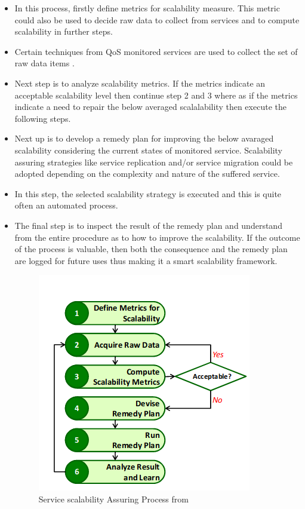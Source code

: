 \begin{itemize}
	

\item In this process, firstly define metrics for scalability measure. This metric could also be used to decide raw data to collect from services and to compute scalability in further steps.

\item Certain techniques from QoS monitored services are used to collect the set of raw data items \cite{Artaiam2008EnhancingSQ} \cite{hutchison_monitoring_2007}.

\item Next step is to analyze scalability metrics. If the metrics indicate an acceptable scalability level then continue step 2 and 3 where as if the metrics indicate a need to repair the below averaged scalalability then execute the following steps. 


\item Next up is to develop a remedy plan for improving the below avaraged scalability considering the current states of monitored service. Scalability assuring strategies like service replication and/or service migration could be adopted depending on the complexity and nature of the suffered service. 


\item In this step, the selected scalability strategy is executed and this is quite often an automated process. 

\item The final step is to inspect the result of the remedy plan and understand from the entire procedure as to how to improve the scalability. If the outcome of the process is valuable, then both the consequence and the remedy plan are logged for future uses thus making it a smart scalability framework.


\begin{figure}[h]
	\centering
	\includegraphics[width=0.7\linewidth]{figures/ServiceScalability}
	\caption{Service scalability Assuring Process from \cite{lee_software_2010}}
	\label{fig:servicescalability}
\end{figure}

\end{itemize}

